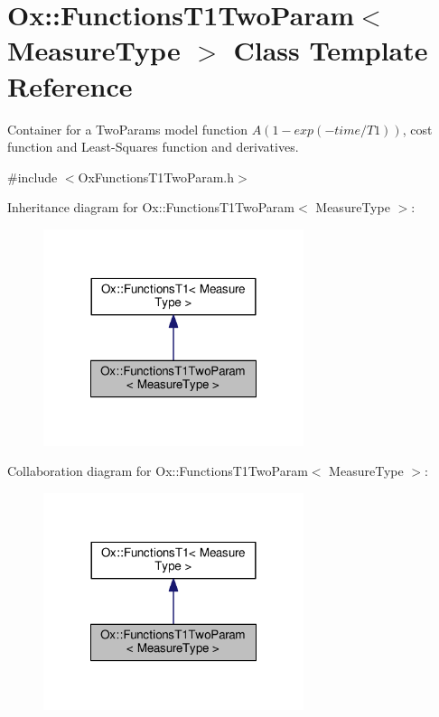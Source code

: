 \hypertarget{class_ox_1_1_functions_t1_two_param}{\section{Ox\-:\-:Functions\-T1\-Two\-Param$<$ Measure\-Type $>$ Class Template Reference}
\label{class_ox_1_1_functions_t1_two_param}
}


Container for a Two\-Params model function $ A(1 - exp( -time / T1 )) $, cost function and Least-\/\-Squares function and derivatives.  




{\ttfamily \#include $<$Ox\-Functions\-T1\-Two\-Param.\-h$>$}



Inheritance diagram for Ox\-:\-:Functions\-T1\-Two\-Param$<$ Measure\-Type $>$\-:
\nopagebreak
\begin{figure}[H]
\begin{center}
\leavevmode
\includegraphics[width=216pt]{class_ox_1_1_functions_t1_two_param__inherit__graph}
\end{center}
\end{figure}


Collaboration diagram for Ox\-:\-:Functions\-T1\-Two\-Param$<$ Measure\-Type $>$\-:
\nopagebreak
\begin{figure}[H]
\begin{center}
\leavevmode
\includegraphics[width=216pt]{class_ox_1_1_functions_t1_two_param__coll__graph}
\end{center}
\end{figure}
